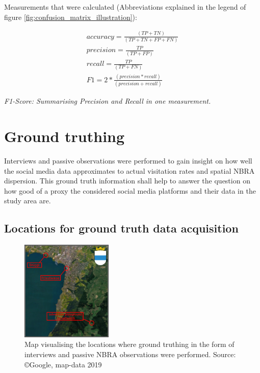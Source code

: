 Measurements that were calculated (Abbreviations explained in the legend of figure \ref{fig:confusion_matrix_illustration}):

\begin{gather*}
accuracy = \frac{(TP+TN)}{(TP+TN+FP+FN)}\\
precision = \frac{TP}{(TP+FP)}\\
recall = \frac{TP}{(TP+FN)}\\
F1 = 2*\frac{(precision*recall)}{(precision+recall)}
\end{gather*}

\textit{F1-Score: Summarising Precision and Recall in one measurement.}

\clearpage

\section{Ground truthing} \label{groud_truthing}
Interviews and passive observations were performed to gain insight on how well the social media data approximates to actual visitation rates and spatial NBRA dispersion. This ground truth information shall help to answer the question on how good of a proxy the considered social media platforms and their data in the study area are.

\subsection{Locations for ground truth data acquisition} \label{locations_ground_truthing_data}

\begin{figure} %
    \centerline{\includegraphics[trim={0 0 0 0},clip,width=0.39\textwidth]{img/interviews_locations}}
  \caption{Map visualising the locations where ground truthing in the form of interviews and passive NBRA observations were performed. Source: \copyright Google, map-data 2019}
  \label{fig:locations_ground_truthing}
\end{figure}

